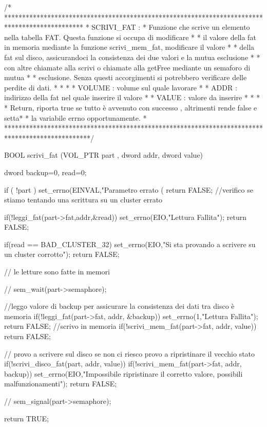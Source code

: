 



/* **********************************************************************************************
 * SCRIVI_FAT :  
 * Funzione che scrive un elemento nella tabella FAT. Questa funzione si occupa di modificare *
 * il valore della fat in memoria mediante la funzione scrivi_mem_fat, modificare il valore *
 * della fat sul disco, assicurandoci la consistenza dei due valori e la mutua esclusione *
 * con altre chiamate alla scrivi o chiamate alla getFree mediante un semaforo di mutua  *
 * esclusione. Senza questi accorgimenti si potrebbero verificare delle perdite di dati.  *
 * 											*
 * VOLUME : volume sul quale lavorare							* 
 * ADDR   : indirizzo della fat nel quale inserire il valore 				*
 * VALUE : valore da inserire 								*
 * 											*
 * Return, riporta true se tutto è avvenuto con successo , altrimenti rende false e setta* 
 * la variabile errno opportunamente.							*
 ************************************************************************************************/

BOOL scrivi_fat  (VOL_PTR part , dword addr, dword value) {
  

    dword backup=0, read=0; 
    
    
    if ( !part ) {
      set_errno(EINVAL,"Parametro errato (%
      return FALSE;
    }
    //verifico se stiamo tentando una scrittura su un cluster errato 
    
    if(!leggi_fat(part->fat,addr,&read)) {
	 set_errno(EIO,"Lettura Fallita");
	 return FALSE; 
    }
    
    if(read == BAD_CLUSTER_32) { 
	set_errno(EIO,"Si sta provando a scrivere su un cluster corrotto"); 
	return FALSE; 
    }
   
   // le letture sono fatte in memori
    
  //  sem_wait(part->semaphore);
    
      //leggo valore di backup per assicurare la consistenza dei dati tra disco è memoria
      if(!leggi_fat(part->fat, addr, &backup)) {
	 set_errno(1,"Lettura Fallita");
	 return FALSE; 
      }
      //scrivo in memoria 
      if(!scrivi_mem_fat(part->fat, addr, value))
	  return FALSE; 
	  
      // provo a scrivere sul disco se non ci riesco provo a ripristinare il vecchio stato
      if(!scrivi_disco_fat(part, addr, value)) {
	  if(!scrivi_mem_fat(part->fat, addr, backup))
	    set_errno(EIO,"Impossibile ripristinare il corretto valore, possibili malfunzionamenti");
	  return FALSE; 
      } 
  
  //  sem_signal(part->semaphore); 
  
    return TRUE; 
} 

